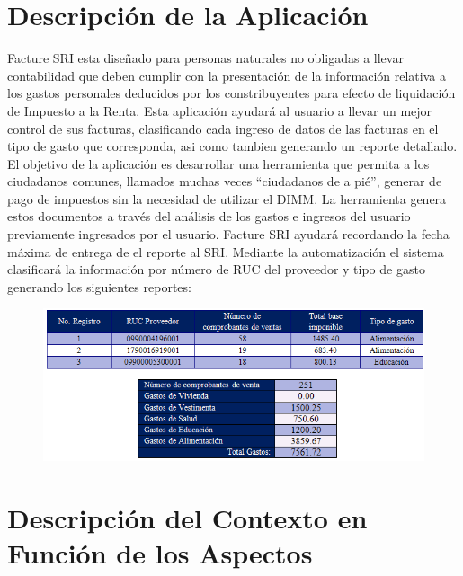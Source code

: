 \documentclass[a4paper,11pt]{article}
\begin{document}
\section{ Descripción de la Aplicación}
Facture SRI esta diseñado para  personas naturales no obligadas a llevar contabilidad que deben cumplir con la presentación de la información relativa a los gastos personales deducidos por los constribuyentes para efecto de liquidación de Impuesto a la Renta.
Esta aplicación ayudará al usuario a llevar un mejor control de sus facturas, clasificando cada ingreso de datos de las facturas en el tipo de gasto que corresponda, asi como tambien generando un reporte detallado. 
El objetivo de la aplicación  es desarrollar una herramienta que permita a los ciudadanos comunes, llamados muchas veces  “ciudadanos de a pié”, generar de pago de impuestos sin la necesidad de utilizar el DIMM. La herramienta genera estos documentos a través del análisis de los gastos e ingresos del usuario previamente ingresados por el usuario.
Facture SRI  ayudará  recordando la fecha máxima de entrega de el reporte al SRI. 
Mediante la automatización el sistema clasificará la información por número de RUC del proveedor y tipo de gasto generando los siguientes reportes: 

\begin{figure} [h]
\begin {center}
\includegraphics[width=1\textwidth]{img.png}
\end {center}
\end{figure}


\section{ Descripción del Contexto en Función de los Aspectos}
\end{document}

